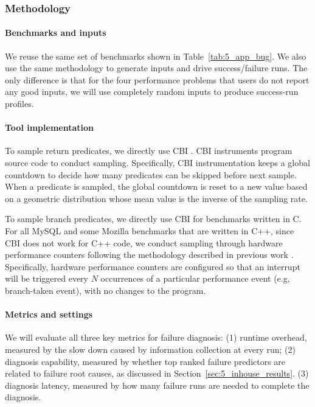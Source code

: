 \subsubsection{Methodology}
\paragraph{Benchmarks and inputs}
We reuse the same set of benchmarks shown in Table~\ref{tab:5_app_bug}. 
We also use the same methodology to generate inputs and drive success/failure
runs. The only difference is that for the four performance problems that users
do not report any good inputs, we will use completely random inputs to produce
success-run profiles.

\paragraph{Tool implementation}
To sample return predicates, we directly use CBI \citep{liblit03,liblit05}.
CBI instruments program source code to conduct sampling.
Specifically, CBI instrumentation keeps a global countdown to decide how many 
predicates can be skipped before next sample. 
When a predicate is sampled, 
the global countdown is reset to a new value based on a geometric distribution 
whose mean value is the inverse of the sampling rate. 

To sample branch predicates, we directly use CBI for benchmarks written in 
C. For all MySQL and some Mozilla benchmarks that are written in C++, since
CBI does not work for C++ code, we conduct sampling through
hardware performance counters following the
methodology described in previous work \citep{joy.asplos13}.
Specifically, hardware performance
counters are configured so that an interrupt will be triggered every $N$
occurrences of a particular performance event (e.g, branch-taken event), with no changes to the program.

\paragraph{Metrics and settings}
We will evaluate all three key metrics for failure diagnosis:
(1) runtime overhead, measured by the slow down caused by information
collection at every run;
(2) diagnosis capability,
measured by whether top ranked failure predictors are 
related to failure root causes, as discussed in 
Section~\ref{sec:5_inhouse_results}.
(3) diagnosis latency,
measured by how many failure runs are needed 
to complete the diagnosis. 

